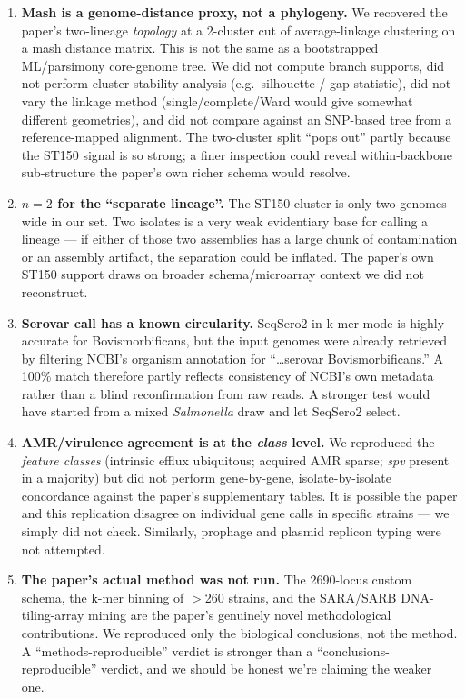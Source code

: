 \documentclass[11pt]{article}
\begin{document}
\begin{enumerate}
\item \textbf{Mash is a genome-distance proxy, not a phylogeny.} We recovered the paper's two-lineage \emph{topology} at a 2-cluster cut of average-linkage clustering on a mash distance matrix. This is not the same as a bootstrapped ML/parsimony core-genome tree. We did not compute branch supports, did not perform cluster-stability analysis (e.g.\ silhouette / gap statistic), did not vary the linkage method (single/complete/Ward would give somewhat different geometries), and did not compare against an SNP-based tree from a reference-mapped alignment. The two-cluster split ``pops out'' partly because the ST150 signal is so strong; a finer inspection could reveal within-backbone sub-structure the paper's own richer schema would resolve.

\item \textbf{$n=2$ for the ``separate lineage''.} The ST150 cluster is only two genomes wide in our set. Two isolates is a very weak evidentiary base for calling a lineage --- if either of those two assemblies has a large chunk of contamination or an assembly artifact, the separation could be inflated. The paper's own ST150 support draws on broader schema/microarray context we did not reconstruct.

\item \textbf{Serovar call has a known circularity.} SeqSero2 in k-mer mode is highly accurate for Bovismorbificans, but the input genomes were already retrieved by filtering NCBI's organism annotation for ``\ldots serovar Bovismorbificans.'' A 100\% match therefore partly reflects consistency of NCBI's own metadata rather than a blind reconfirmation from raw reads. A stronger test would have started from a mixed \emph{Salmonella} draw and let SeqSero2 select.

\item \textbf{AMR/virulence agreement is at the \emph{class} level.} We reproduced the \emph{feature classes} (intrinsic efflux ubiquitous; acquired AMR sparse; \emph{spv} present in a majority) but did not perform gene-by-gene, isolate-by-isolate concordance against the paper's supplementary tables. It is possible the paper and this replication disagree on individual gene calls in specific strains --- we simply did not check. Similarly, prophage and plasmid replicon typing were not attempted.

\item \textbf{The paper's actual method was not run.} The 2690-locus custom schema, the k-mer binning of $>$260 strains, and the SARA/SARB DNA-tiling-array mining are the paper's genuinely novel methodological contributions. We reproduced only the biological conclusions, not the method. A ``methods-reproducible'' verdict is stronger than a ``conclusions-reproducible'' verdict, and we should be honest we're claiming the weaker one.


\end{enumerate}
\end{document}
